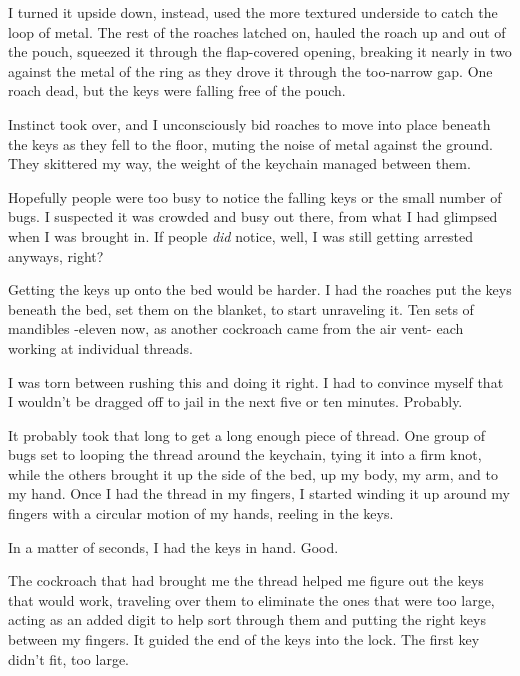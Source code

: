 I turned it upside down, instead, used the more textured underside to catch the loop of metal.  The rest of the roaches latched on, hauled the roach up and out of the pouch, squeezed it through the flap-covered opening, breaking it nearly in two against the metal of the ring as they drove it through the too-narrow gap.  One roach dead, but the keys were falling free of the pouch.



Instinct took over, and I unconsciously bid roaches to move into place beneath the keys as they fell to the floor, muting  the noise of metal against the ground.  They skittered my way, the weight of the keychain managed between them.



Hopefully people were too busy to notice the falling keys or the small number of bugs.  I suspected it was crowded and busy out there, from what I had glimpsed when I was brought in.  If people \emph{did} notice, well, I was still getting arrested anyways, right?



Getting the keys up onto the bed would be harder.  I had the roaches put the keys beneath the bed, set them on the blanket, to start unraveling it.  Ten sets of mandibles -eleven now, as another cockroach came from the air vent- each working at individual threads.



I was torn between rushing this and doing it right.  I had to convince myself that I wouldn't be dragged off to jail in the next five or ten minutes.  Probably.



It probably took that long to get a long enough piece of thread.  One group of bugs set to looping the thread around the keychain, tying it into a firm knot, while the others brought it up the side of the bed, up my body, my arm, and to my hand.  Once I had the thread in my fingers, I started winding it up around my fingers with a circular motion of my hands, reeling in the keys.



In a matter of seconds, I had the keys in hand.  Good.



The cockroach that had brought me the thread helped me figure out the keys that would work, traveling over them to eliminate the ones that were too large, acting as an added digit to help sort through them and putting the right keys between my fingers.  It guided the end of the keys into the lock.  The first key didn't fit, too large.



